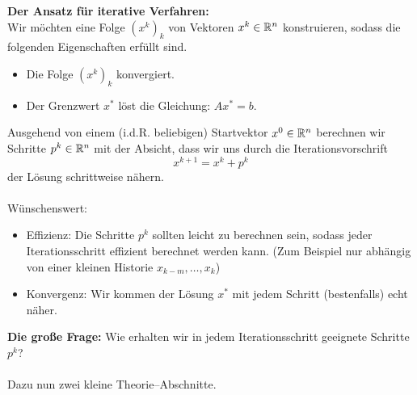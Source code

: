\textbf{Der Ansatz für iterative Verfahren:}\\
Wir möchten eine Folge $(x^k)_k$ von Vektoren $x^k \in {\mathbb{R}}^{n}$ konstruieren, sodass die folgenden Eigenschaften erfüllt sind.
\begin{itemize}
	\item Die Folge $(x^k)_k$ konvergiert.
	\item Der Grenzwert $x^*$ löst die Gleichung: $Ax^* =b$.
\end{itemize}
Ausgehend von einem (i.d.R. beliebigen) Startvektor $x^0 \in {\mathbb{R}}^{n}$ berechnen wir Schritte $p^k\in {\mathbb{R}}^{n}$ mit der Absicht, dass wir uns durch die Iterationsvorschrift
$$x^{k+1} = x^k + p^k $$
der Lösung schrittweise nähern.
~\\~\\
Wünschenswert:
\begin{itemize}
	\item Effizienz: Die Schritte $p^k$ sollten leicht zu berechnen sein, sodass jeder Iterationsschritt effizient berechnet werden kann. (Zum Beispiel nur abhängig von einer kleinen Historie $x_{k-m},\ldots, x_{k}$)
	\item Konvergenz: Wir kommen der Lösung $x^*$ mit jedem Schritt  (bestenfalls) echt näher.
\end{itemize}
\textbf{Die große Frage:} Wie erhalten wir in jedem Iterationsschritt geeignete Schritte $p^k$?\\~\\ Dazu nun zwei kleine Theorie--Abschnitte.


